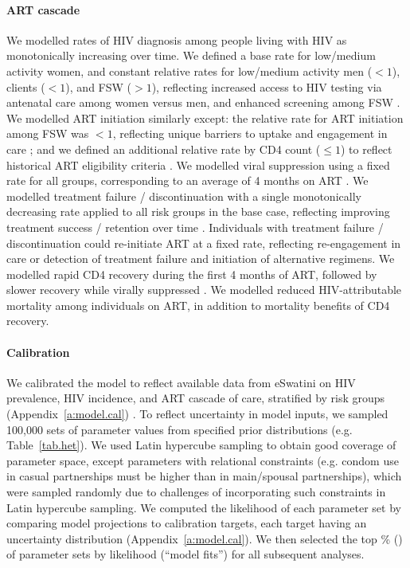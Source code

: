 \paragraph{ART cascade}
We modelled rates of HIV diagnosis among people living with HIV as monotonically increasing over time.
We defined a base rate for low/medium activity women,
and constant relative rates for low/medium activity men ($<1$), clients ($<1$), and FSW ($>1$),
reflecting increased access to HIV testing via antenatal care among women versus men,
and enhanced screening among FSW \cite{Baral2014}.
We modelled ART initiation similarly except:
the relative rate for ART initiation among FSW was $<1$,
reflecting unique barriers to uptake and engagement in care \cite{Mountain2014a}; and
we defined an additional relative rate by CD4 count ($\le1$)
to reflect historical ART eligibility criteria \cite{NERCHA2018}.
We modelled viral suppression using a fixed rate for all groups,
corresponding to an average of 4 months on ART \cite{Mujugira2016}.
We modelled treatment failure / discontinuation with a single monotonically decreasing rate
applied to all risk groups in the base case,
reflecting improving treatment success / retention over time \cite{NERCHA2014}.
Individuals with treatment failure / discontinuation could re-initiate ART at a fixed rate,
reflecting re-engagement in care or detection of treatment failure and initiation of alternative regimens.
We modelled rapid CD4 recovery during the first 4 months of ART,
followed by slower recovery while virally suppressed \cite{Battegay2006,Lawn2006,Gabillard2013}.
We modelled reduced HIV-attributable mortality among individuals on ART,
in addition to mortality benefits of CD4 recovery.
\paragraph{Calibration}
We calibrated the model to reflect
available data from eSwatini on HIV prevalence, HIV incidence, and ART cascade of care,
stratified by risk groups (Appendix~\ref{a:model.cal}) \cite{SDHS2006,SHIMS1,SHIMS2,Baral2014,EswKP2014}.
To reflect uncertainty in model inputs,
we sampled 100,000 sets of parameter values from specified prior distributions %
(e.g. Table~\ref{tab.het}).
We used Latin hypercube sampling \cite{McKay1979}
to obtain good coverage of parameter space,
except parameters with relational constraints
(e.g. condom use in casual partnerships must be higher than in main/spousal partnerships),
which were sampled randomly due to
challenges of incorporating such constraints in Latin hypercube sampling.
We computed the likelihood of each parameter set by
comparing model projections to calibration targets,
each target having an uncertainty distribution (Appendix~\ref{a:model.cal}).
We then selected the top \% () of parameter sets by likelihood (``model fits'')
for all subsequent analyses.
